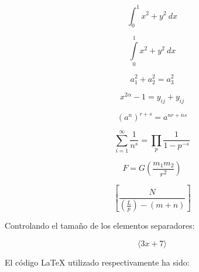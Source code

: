 \documentclass[12pt,a4paper,oneside,]{article}
\numberwithin{dummy}{section}
\theoremstyle{ocrenumbox}
\theoremstyle{blacknumex}
\theoremstyle{blacknumbox}
\theoremstyle{ocrenum}
\theoremstyle{ocrenum}
\begin{document}
\[ \int_0^1 x^2 + y^2 \ dx \]

\[ \int\limits_0^1 x^2 + y^2 \ dx \]

\[ a_1^2 + a_2^2 = a_3^2 \]

\[ x^{2 \alpha} - 1 = y_{ij} + y_{ij}  \]

\[ (a^n)^{r+s} = a^{nr+ns}  \]

\[ \sum_{i=1}^{\infty} \frac{1}{n^s} 
= \prod_p \frac{1}{1 - p^{-s}} \]

\[ 
F = G \left( \frac{m_1 m_2}{r^2} \right)
\]

\[ 
 \left[  \frac{ N } { \left( \frac{L}{p} \right)  - (m+n) }  \right]
\]

Controlando el tamaño de los elementos separadores:

\[
 \Bigg \langle 3x+7 \bigg \rangle
\]

El código LaTeX utilizado respectivamente ha sido:
\end{document}
